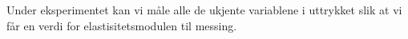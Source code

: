 \documentclass[%
 reprint,
 amsmath,amssymb,
 aps,
 norsk,
 booktabs
]{revtex4-1}
\begin{document}
Under eksperimentet kan vi måle alle de ukjente variablene i uttrykket slik at vi får en verdi for elastisitetsmodulen til messing.\\
\end{document}
